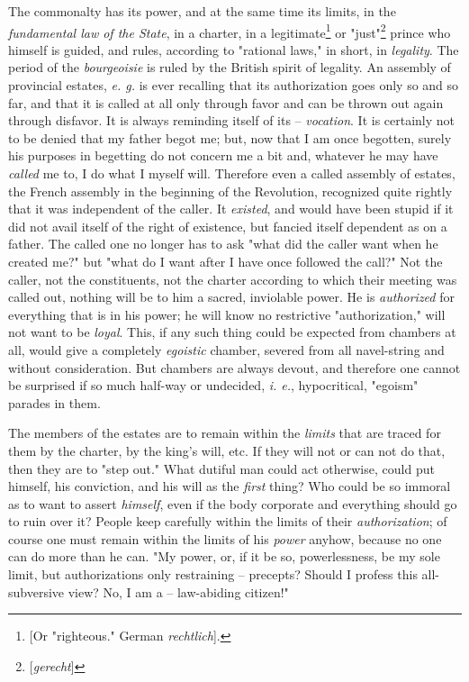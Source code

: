 The commonalty has its power, and at the same time its limits, in the 
\textit{fundamental law of the State}, in a charter, in a 
legitimate\footnote{[Or "{}righteous."{} German \textit{rechtlich}].} or 
"{}just"{}\footnote{[\textit{gerecht}]} prince who himself is guided, and 
rules, according to "{}rational laws,"{} in short, in \textit{legality}. The 
period of the \textit{bourgeoisie} is ruled by the British spirit of legality. 
An assembly of provincial estates, \textit{e. g.} is ever recalling that its 
authorization goes only so and so far, and that it is called at all only 
through favor and can be thrown out again through disfavor. It is always 
reminding itself of its -- \textit{vocation}. It is certainly not to be denied 
that my father begot me; but, now that I am once begotten, surely his purposes 
in begetting do not concern me a bit and, whatever he may have \textit{called} 
me to, I do what I myself will. Therefore even a called assembly of estates, 
the French assembly in the beginning of the Revolution, recognized quite 
rightly that it was independent of the caller. It \textit{existed}, and would 
have been stupid if it did not avail itself of the right of existence, but 
fancied itself dependent as on a father. The called one no longer has to ask 
"{}what did the caller want when he created me?"{} but "{}what do I want after 
I have once followed the call?"{} Not the caller, not the constituents, not 
the charter according to which their meeting was called out, nothing will be 
to him a sacred, inviolable power. He is \textit{authorized} for everything 
that is in his power; he will know no restrictive "{}authorization,"{} will 
not want to be \textit{loyal}. This, if any such thing could be expected from 
chambers at all, would give a completely \textit{egoistic} chamber, severed 
from all navel-string and without consideration. But chambers are always 
devout, and therefore one cannot be surprised if so much half-way or 
undecided, \textit{i. e.}, hypocritical, "{}egoism"{} parades in them.

The members of the estates are to remain within the \textit{limits} that are 
traced for them by the charter, by the king's will, etc. If they will not or 
can not do that, then they are to "{}step out."{} What dutiful man could act 
otherwise, could put himself, his conviction, and his will as the 
\textit{first} thing? Who could be so immoral as to want to assert 
\textit{himself}, even if the body corporate and everything should go to ruin 
over it? People keep carefully within the limits of their 
\textit{authorization}; of course one must remain within the limits of his 
\textit{power} anyhow, because no one can do more than he can. "{}My power, 
or, if it be so, powerlessness, be my sole limit, but authorizations only 
restraining -- precepts? Should I profess this all-subversive view? No, I am a 
-- law-abiding citizen!"{}

